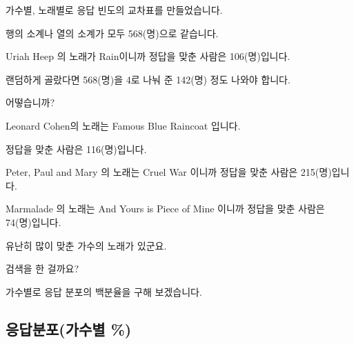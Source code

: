 \documentclass[
]{book}
\begin{document}
가수별, 노래별로 응답 빈도의 교차표를 만들었습니다.

행의 소계나 열의 소계가 모두 568(명)으로 같습니다.

Uriah Heep 의 노래가 Rain이니까 정답을 맞춘 사람은 106(명)입니다.

랜덤하게 골랐다면 568(명)을 4로 나눠 준 142(명) 정도 나와야 합니다.

어떻습니까?

Leonard Cohen의 노래는 Famous Blue Raincoat 입니다.

정답을 맞춘 사람은 116(명)입니다.

Peter, Paul and Mary 의 노래는 Cruel War 이니까 정답을 맞춘 사람은 215(명)입니다.

Marmalade 의 노래는 And Yours is Piece of Mine 이니까 정답을 맞춘 사람은 74(명)입니다.

유난히 많이 맞춘 가수의 노래가 있군요.

검색을 한 걸까요?

가수별로 응답 분포의 백분율을 구해 보겠습니다.

\subsection{응답분포(가수별 \%)}\label{uxc751uxb2f5uxbd84uxd3ecuxac00uxc218uxbcc4-1}
\end{document}
